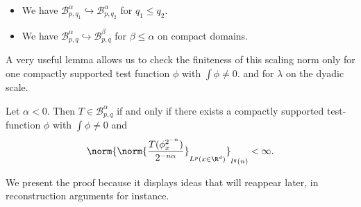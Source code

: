 \begin{remark}
    \begin{itemize}
        \item We have $\mathcal{B}^\alpha_{p,q_1} \hookrightarrow \mathcal{B}^\alpha_{p,q_2}$ for $q_1 \leq q_2.$
        \item We have $\mathcal{B}^\alpha_{p,q} \hookrightarrow \mathcal{B}^\beta_{p,q}$ for $\beta \leq \alpha$ on compact domains.
    \end{itemize}
\end{remark}


A very useful lemma allows us to check the finiteness of this scaling norm only for one compactly supported test function $\phi$ with $\int \phi \neq 0.$ and for $\lambda$ on the dyadic scale.
\begin{lemma}
    \label{lem:technique1}
    Let $\alpha<0$. Then $T \in \mathcal{B}^\alpha_{p,q}$ if and only if there exists a compactly supported test-function $\phi$ with $\int \phi \neq 0$ and
    $$\norm{\norm{\frac{T(\phi^{2^{-n}}_x)}{2^{-n\alpha}}}_{L^p(x\in \R^d)}}_{l^q(n)} < \infty.$$
\end{lemma}
 We present the proof because it displays ideas that will reappear later, in reconstruction arguments for instance.
